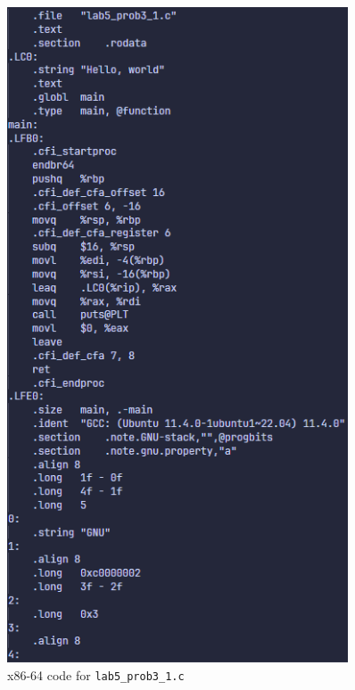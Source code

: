 \documentclass{article}
\begin{document}
\begin{minipage}{0.5\textwidth}
    \begin{figure}[H]
        \centering
        \includegraphics[width=0.9\textwidth]{../images/prob3_code1.png}
        \caption{x86-64 code for \texttt{lab5\_prob3\_1.c}}
    \end{figure}
\end{minipage}
\end{document}
